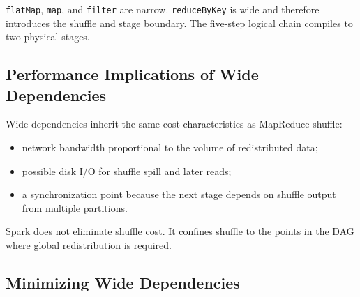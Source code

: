 \documentclass[11pt,a4paper,oneside]{book}
\begin{document}
\begin{center}
\end{center}

\texttt{flatMap}, \texttt{map}, and \texttt{filter} are narrow. \texttt{reduceByKey} is wide and therefore introduces the shuffle and stage boundary. The five-step logical chain compiles to two physical stages.

\subsection{Performance Implications of Wide Dependencies}

Wide dependencies inherit the same cost characteristics as MapReduce shuffle:

\begin{itemize}
    \item network bandwidth proportional to the volume of redistributed data;
    \item possible disk I/O for shuffle spill and later reads;
    \item a synchronization point because the next stage depends on shuffle output from multiple partitions.
\end{itemize}

Spark does not eliminate shuffle cost. It confines shuffle to the points in the DAG where global redistribution is required.

\subsection{Minimizing Wide Dependencies}
\end{document}

